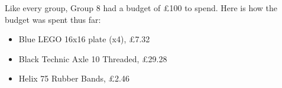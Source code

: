 Like every group, Group 8 had a budget of £100 to spend. Here is how the budget was spent thus far:
\begin{itemize}
  \itemsep0em 
  \item Blue LEGO 16x16 plate (x4), \pounds 7.32
  \item Black Technic Axle 10 Threaded, \pounds 29.28
  \item Helix 75 Rubber Bands, \pounds 2.46
\end{itemize}